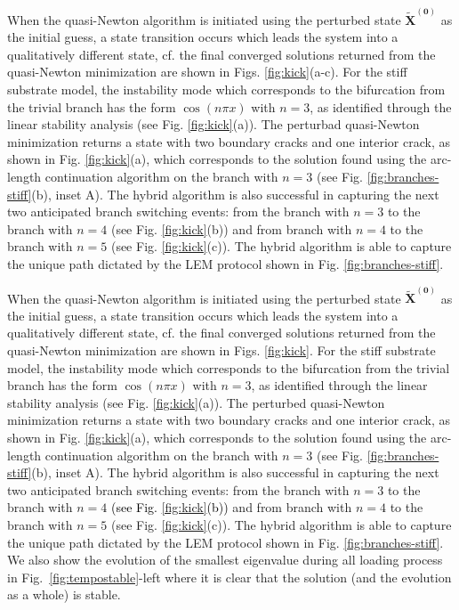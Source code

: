 When the quasi-Newton algorithm is initiated using the perturbed state \(\mathbf{\tilde X^{(0)}}\)
as the initial guess, {a state transition} occurs which leads the system into a qualitatively different state, cf. the final  converged solutions returned from the quasi-Newton minimization are shown in Figs. \ref{fig:kick}(a-c). For the stiff substrate model, the {instability mode} which corresponds to the bifurcation from the trivial branch has the form \(\cos(n\pi x)\) with \(n=3\), as identified through the linear stability analysis (see Fig. \ref{fig:kick}(a)). 
The perturbad quasi-Newton minimization returns a state with two boundary cracks and one interior crack, as shown in Fig. \ref{fig:kick}(a), which corresponds to the solution found using the arc-length continuation algorithm on the branch with \(n=3\) (see Fig. \ref{fig:branches-stiff}(b), inset A).  The hybrid algorithm is also successful in capturing the next two anticipated branch   switching events: from the  branch with \(n=3\)  to the branch  with \(n=4\) (see Fig. \ref{fig:kick}(b)) and  from branch with \(n=4\)  to the branch  with \(n=5\) (see Fig. \ref{fig:kick}(c)). The hybrid algorithm is able to capture the unique path dictated by the LEM protocol shown in Fig. \ref{fig:branches-stiff}.   


When the quasi-Newton algorithm is initiated using the perturbed state \(\mathbf{\tilde X^{(0)}}\) as the initial guess, {a state transition} occurs which leads the system into a qualitatively different state, cf. the final  converged solutions returned from the quasi-Newton minimization are shown in  Figs. \ref{fig:kick}. For the stiff substrate model, the {instability mode} which corresponds to the bifurcation from the trivial branch has the form \(\cos(n\pi x)\) with \(n=3\), as identified through the linear stability analysis (see Fig. {\ref{fig:kick}(a))}. 
The perturbed quasi-Newton minimization returns a state with two boundary cracks and one interior crack, as shown in Fig. {\ref{fig:kick}(a)}, which corresponds to the solution found using the arc-length continuation algorithm on the branch with \(n=3\) (see Fig. \ref{fig:branches-stiff}(b), inset A).  The hybrid algorithm is also successful in capturing the next two anticipated branch   switching events: from the  branch with \(n=3\)  to the branch  with \(n=4\) \textcolor{black}{(see Fig. \ref{fig:kick}(b))} and  from branch with \(n=4\)  to the branch  with \(n=5\) {(see Fig. \ref{fig:kick}(c))}. The hybrid algorithm is able to capture the unique path dictated by the LEM protocol shown in Fig. \ref{fig:branches-stiff}. {We also show the evolution of the smallest eigenvalue during all loading process in Fig.~\ref{fig:tempostable}-left where  it is clear that  the solution (and the evolution as a whole) is stable.}

